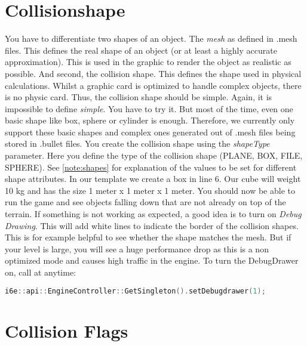 \documentclass{article}
\begin{document}
\section{Collisionshape}

You have to differentiate two shapes of an object. The \textit{mesh} as defined in .mesh files. This defines the real shape of an object (or at least a highly accurate approximation). This is used in the graphic to render the object as realistic as possible. And second, the collision shape. This defines the shape used in physical calculations. Whilst a graphic card is optimized to handle complex objects, there is no physic card. Thus, the collision shape should be simple. Again, it is impossible to define \textit{simple}. You have to try it. But most of the time, even one basic shape like box, sphere or cylinder is enough. Therefore, we currently only support these basic shapes and complex ones generated out of .mesh files being stored in .bullet files. You create the collision shape using the \textit{shapeType} parameter. Here you define the type of the collision shape (PLANE, BOX, FILE, SPHERE). See \ref{note:shapes} for explanation of the values to be set for different shape attributes. In our template we create a box in line 6. Our cube will weight 10 kg and has the size 1 meter x 1 meter x 1 meter.\newline
You should now be able to run the game and see objects falling down that are not already on top of the terrain. If something is not working as expected, a good idea is to turn on \textit{Debug Drawing}. This will add white lines to indicate the border of the collision shapes. This is for example helpful to see whether the shape matches the mesh. But if your level is large, you will see a huge performance drop as this is a non optimized mode and causes high traffic in the engine. To turn the DebugDrawer on, call at anytime:
\begin{lstlisting}[language=C++, style=basic, caption={enabling debug drawer}, label=code:load]
i6e::api::EngineController::GetSingleton().setDebugdrawer(1);
\end{lstlisting}

\section{Collision Flags}
\end{document}
